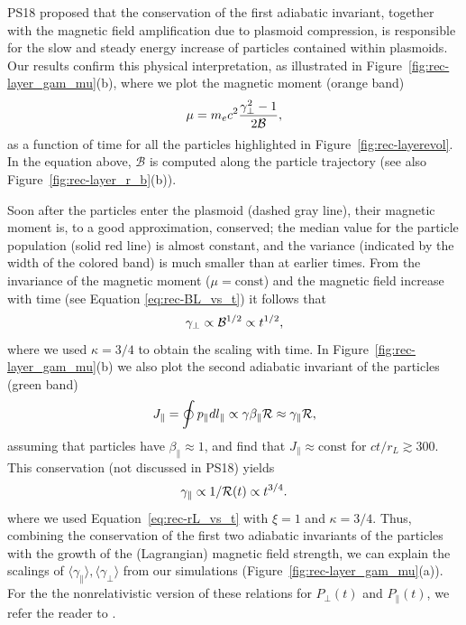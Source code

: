 PS18 proposed that the conservation of the first adiabatic invariant, together with the magnetic field amplification due to plasmoid compression, is responsible for the slow and steady energy increase of particles contained within plasmoids. Our results confirm this physical interpretation, as illustrated in  Figure~\ref{fig:rec-layer_gam_mu}(b),
where we plot the magnetic moment (orange band)
\begin{equation}
\label{eq:rec-mu}
    \mu=m_e c^2\frac{\gamma_\perp^2-1}{2 \mathcal{B}},
\end{equation} 
as a function of time for all the particles highlighted in Figure~\ref{fig:rec-layerevol}. In the equation above, $\mathcal{B}$ is computed along the particle trajectory (see also Figure~\ref{fig:rec-layer_r_b}(b)).

Soon after the particles enter the plasmoid (dashed gray line), their magnetic moment is, to a good approximation, conserved; the median value for the particle population (solid red line) is almost constant, and the variance (indicated by the width of the colored band) is much smaller than at earlier times. From the invariance of the magnetic moment ($\mu = \mathrm{const}$) and the magnetic field increase with time (see Equation \eqref{eq:rec-BL_vs_t}) it follows that
\begin{equation}
    \gamma_{\perp}\propto \mathcal{B}^{1/2}\propto t^{1/2},
\end{equation}
where we used $\kappa=3/4$ to obtain the scaling with time. In Figure~\ref{fig:rec-layer_gam_mu}(b) we also plot the second adiabatic invariant of the particles (green band)
\begin{equation}
\label{eq:rec-Jpar}
    J_{\parallel}=\oint p_{\parallel}dl_{\parallel} \propto \gamma\beta_{\parallel}\mathcal{R}\approx
    \gamma_{\parallel}\mathcal{R},
\end{equation}
assuming that particles have $\beta_\parallel\approx 1$, and find that $J_{\parallel}\approx \mathrm{const}$ for $ct/r_L \gtrsim 300$. This conservation (not discussed in PS18) yields
\begin{equation}
    \gamma_{\parallel}\propto 1/\mathcal{R}(t)\propto t^{3/4}.
\end{equation}
where we used Equation~\eqref{eq:rec-rL_vs_t} with $\xi=1$ and $\kappa=3/4$. Thus, combining the conservation of the first two adiabatic invariants of the particles with the growth of the (Lagrangian) magnetic field strength, we can explain the scalings of $\langle \gamma_{\parallel}\rangle, \langle\gamma_{\perp}\rangle$ from our simulations (Figure~\ref{fig:rec-layer_gam_mu}(a)). For the the nonrelativistic version of these relations for $P_\perp(t)$ and $P_\parallel(t)$, we refer the reader to  \cite{2017PhPl...24f2906M}.

